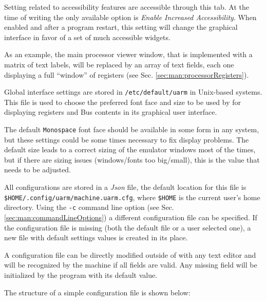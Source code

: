
Setting related to accessibility features are accessible through this tab.
At the time of writing the only available option is \emph{Enable Increased Accessibility}. When enabled and after a program restart, this setting will change the graphical interface in favor of a set of much accessible widgets.

As an example, the main processor viewer window, that is implemented with a matrix of text labels, will be replaced by an array of text fields, each one displaying a full ``window'' of registers (see Sec. \ref{sec:man:processorRegisters}).


Global interface settings are stored in \texttt{/etc/default/uarm} in Unix-based systems.
This file is used to choose the preferred font face and size to be used by \uarm{} for displaying registers and Bus contents in its graphical user interface.

The default \texttt{Monospace} font face should be available in some form in any system, but these settings could be some times necessary to fix display problems.
The default size leads to a correct sizing of the emulator windows most of the times, but if there are sizing issues (windows/fonts too big/small), this is the value that needs to be adjusted.

\label{sec:man:confFileFields}

All configurations are stored in a \emph{Json} file, the default location for this file is \linebreak \texttt{\$HOME/.config/uarm/machine.uarm.cfg}, where \texttt{\$HOME} is the current user's home directory.
Using the \texttt{-c} command line option (see Sec. \ref{sec:man:commandLineOptions}) a different configuration file can be specified.
If the configuration file is missing (both the default file or a user selected one), a new file with default settings values is created in its place.

A configuration file can be directly modified outside of \uarm{} with any text editor and will be recognized by the machine if all fields are valid.
Any missing field will be initialized by the program with its default value.

The structure of a simple configuration file is shown below:


